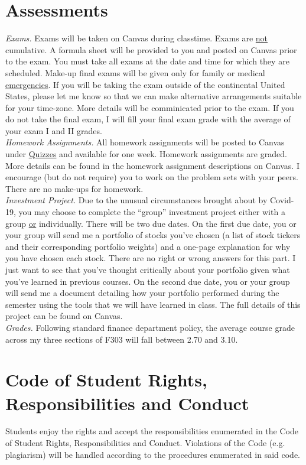 \documentclass[12pt]{article} %
\begin{document}
\section*{Assessments}
\noindent\textit{Exams.} Exams will be taken on Canvas during classtime. Exams are \underline{not} cumulative. A formula sheet will be provided to you and posted on Canvas prior to the exam. You must take all exams at the date and time for which they are scheduled. Make-up final exams will be given only for family or medical \underline{emergencies}. If you will be taking the exam outside of the continental United States, please let me know so that we can make alternative arrangements suitable for your time-zone. More details will be comminicated prior to the exam. If you do not take the final exam, I will fill your final exam grade with the average of your exam I and II grades. \\ 

\noindent\textit{Homework Assignments.} All homework assignments will be posted to Canvas under \underline{Quizzes} and available for one week. Homework assignments are graded. More details can be found in the homework assignment descriptions on Canvas. I encourage (but do not require) you to work on the problem sets with your peers. There are no make-ups for homework.\\

\noindent\textit{Investment Project.} Due to the unusual circumstances brought about by Covid-19, you may choose to complete the ``group'' investment project either with a group \underline{or} individually. There will be two due dates. On the first due date, you or your group will send me a portfolio of stocks you've chosen (a list of stock tickers and their corresponding portfolio weights) and a one-page explanation for why you have chosen each stock. There are no right or wrong answers for this part. I just want to see that you've thought critically about your portfolio given what you've learned in previous courses. On the second due date, you or your group will send me a document detailing how your portfolio performed during the semester using the tools that we will have learned in class. The full details of this project can be found on Canvas. \\

\noindent\textit{Grades.} Following standard finance department policy, the average course grade across my three sections of F303  will fall between 2.70 and 3.10.

\section*{Code of Student Rights, Responsibilities and Conduct}
Students enjoy the rights and accept the responsibilities enumerated in the Code of Student Rights, Responsibilities and Conduct. Violations of the Code (e.g. plagiarism) will be handled according to the procedures enumerated in said code.
\end{document}
